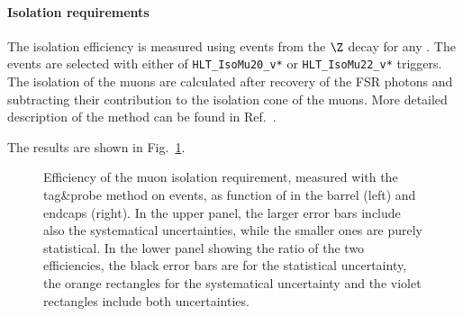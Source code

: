\paragraph*{Isolation requirements}
The isolation efficiency is measured using events from the $\Z$ decay for any \pt. The events are selected with either of \verb=HLT_IsoMu20_v*= or \verb=HLT_IsoMu22_v*= triggers. The isolation of the muons are calculated after recovery of the FSR photons and subtracting their contribution to the isolation cone of the muons. More detailed description of the method can be found in Ref.~\cite{AN-16-217}.

The results are shown in Fig.~\ref{fig:MuonIDEff_3}.
\begin{figure}[htbp]
  \begin{center}
    \caption{Efficiency of the muon isolation requirement, measured with the tag\&probe method on \Z events, as function of \pt in the barrel (left) and endcaps (right). In the upper panel, the larger error bars include also the systematical uncertainties, while the smaller ones are purely statistical. In the lower panel showing the ratio of the two efficiencies, the black error bars are for the statistical uncertainty, the orange rectangles for the systematical uncertainty and the violet rectangles include both uncertainties.}
    \label{fig:MuonIDEff_3}
\end{center}
\end{figure}

